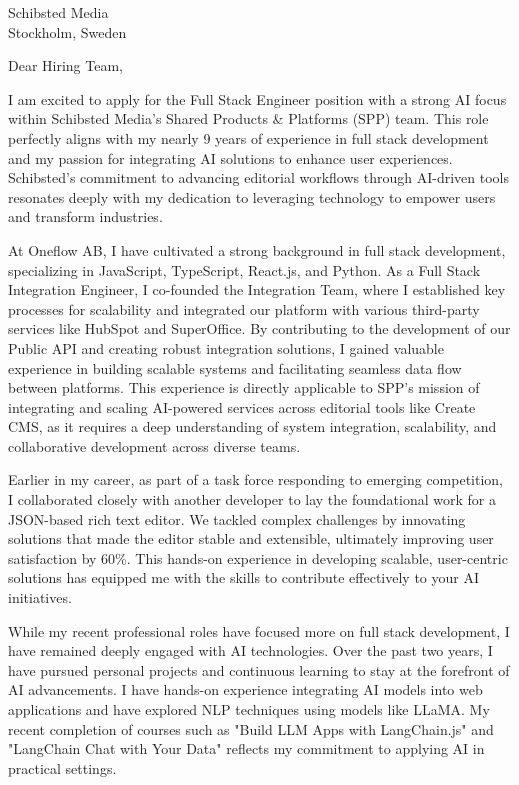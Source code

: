\documentclass{letter}
\begin{document}
\begin{letter}{Schibsted Media\\
Stockholm, Sweden}

\opening{Dear Hiring Team,}

I am excited to apply for the Full Stack Engineer position with a strong AI focus within Schibsted Media's Shared Products \& Platforms (SPP) team.
This role perfectly aligns with my nearly 9 years of experience in full stack development and my passion for integrating AI solutions to enhance user experiences.
Schibsted's commitment to advancing editorial workflows through AI-driven tools resonates deeply with my dedication to leveraging technology to empower users and transform industries.

At Oneflow AB, I have cultivated a strong background in full stack development, specializing in JavaScript, TypeScript, React.js, and Python.
As a Full Stack Integration Engineer, I co-founded the Integration Team, where I established key processes for scalability and integrated our platform with various third-party services like HubSpot and SuperOffice.
By contributing to the development of our Public API and creating robust integration solutions, I gained valuable experience in building scalable systems and facilitating seamless data flow between platforms.
This experience is directly applicable to SPP's mission of integrating and scaling AI-powered services across editorial tools like Create CMS, as it requires a deep understanding of system integration, scalability, and collaborative development across diverse teams.

Earlier in my career, as part of a task force responding to emerging competition, I collaborated closely with another developer to lay the foundational work for a JSON-based rich text editor.
We tackled complex challenges by innovating solutions that made the editor stable and extensible, ultimately improving user satisfaction by 60\%.
This hands-on experience in developing scalable, user-centric solutions has equipped me with the skills to contribute effectively to your AI initiatives.

While my recent professional roles have focused more on full stack development, I have remained deeply engaged with AI technologies.
Over the past two years, I have pursued personal projects and continuous learning to stay at the forefront of AI advancements.
I have hands-on experience integrating AI models into web applications and have explored NLP techniques using models like LLaMA.
My recent completion of courses such as "Build LLM Apps with LangChain.js" and "LangChain Chat with Your Data" reflects my commitment to applying AI in practical settings.


\end{letter}
\end{document}

